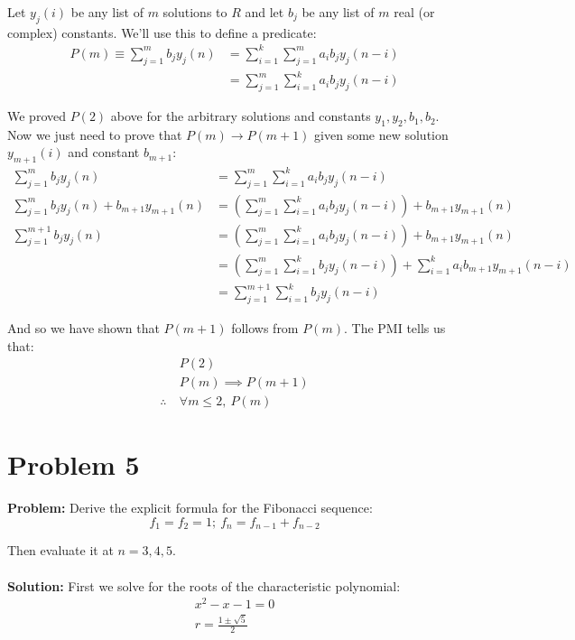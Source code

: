 \documentclass{article}
\begin{document}
Let $y_j(i)$ be any list of $m$ solutions to $R$ and let $b_j$ be any list of $m$ real (or complex) constants. We'll use this to define a predicate:
\begin{align*}
P(m)\equiv\sum_{j=1}^mb_jy_j(n)&=\sum_{i=1}^k\sum_{j=1}^ma_ib_jy_j(n-i)\\
&=\sum_{j=1}^m\sum_{i=1}^ka_ib_jy_j(n-i)
\end{align*}

We proved $P(2)$ above for the arbitrary solutions and constants $y_1, y_2, b_1,b_2$. Now we just need to prove that $P(m)\rightarrow P(m+1)$ given some new solution $y_{m+1}(i)$ and constant $b_{m+1}$:
\begin{align*}
  \sum_{j=1}^mb_jy_j(n)&=\sum_{j=1}^m\sum_{i=1}^ka_ib_jy_j(n-i)\tag{given}\\
  \sum_{j=1}^mb_jy_j(n)+b_{m+1}y_{m+1}(n)&=\left(\sum_{j=1}^m\sum_{i=1}^ka_ib_jy_j(n-i)\right)+b_{m+1}y_{m+1}(n)\\
  \sum_{j=1}^{m+1}b_jy_j(n)&=\left(\sum_{j=1}^m\sum_{i=1}^ka_ib_jy_j(n-i)\right)+b_{m+1}y_{m+1}(n)\tag{def. finitary addition}\\
  &=\left(\sum_{j=1}^m\sum_{i=1}^kb_jy_j(n-i)\right)+\sum_{i=1}^ka_ib_{m+1}y_{m+1}(n-i)\tag{def. of solution}\\
  &=\sum_{j=1}^{m+1}\sum_{i=1}^kb_jy_j(n-i)\tag{def. finitary addition}
\end{align*}

And so we have shown that $P(m+1)$ follows from $P(m)$. The PMI tells us that:
\begin{align*}
  &P(2)\\
  &P(m)\implies P(m+1)\\
  \therefore\ &{\forall m\le2,\ P(m)}
\end{align*}

\section*{Problem 5}
\textbf{Problem:} Derive the explicit formula for the Fibonacci sequence:
$$f_1=f_2=1;\ f_n=f_{n-1}+f_{n-2}$$

Then evaluate it at $n=3,4,5$.
\\\\
\textbf{Solution:} First we solve for the roots of the characteristic polynomial:
\begin{align*}
  x^2-x-1=0\\
  r=\frac{1\pm\sqrt{5}}{2}
\end{align*}
\end{document}
